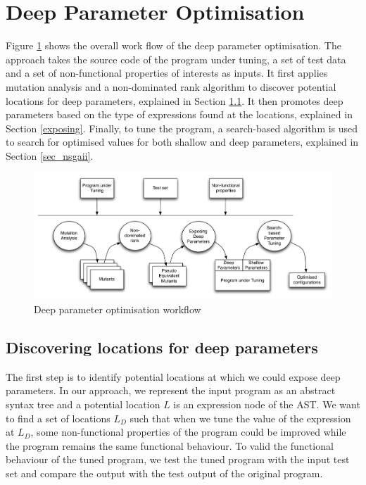 \section{Deep Parameter Optimisation}
\label{sec_deep_parameter_optimisation}

Figure \ref{system} shows the overall work flow of the deep parameter optimisation. The approach takes the source code of the program under tuning, a set of test data and a set of non-functional properties of interests as inputs. 
It first applies mutation analysis and a non-dominated rank algorithm to discover potential locations for deep parameters, explained in Section \ref{discovering}. It then promotes deep parameters based on the type of expressions found at the locations, explained in Section \ref{exposing}. Finally, to tune the program, a search-based algorithm is used to search for optimised values for both shallow and deep parameters, explained in Section \ref{sec_nsgaii}.

\begin{figure}[htbp]
\centering
\includegraphics[width=6.2in]{pics/new_system}
\caption{Deep parameter optimisation workflow}\label{system}
\end{figure}

\subsection{Discovering locations for deep parameters}
\label{discovering}
The first step is to identify potential locations at which we could expose deep parameters. 
In our approach, we represent the input program as an abstract syntax tree and a potential location $L$ is an expression node of the AST. 
We want to find a set of locations $L_D$ such that when we tune the value of the expression at $L_D$, some non-functional properties of the program could be improved while the program remains the same functional behaviour. 
To valid the functional behaviour of the tuned program, we test the tuned program with the input test set and compare the output with the test output of the original program.

